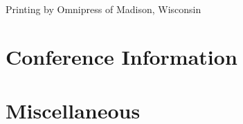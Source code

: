 \documentclass[twoside,makeidx]{book}
\begin{document}
\fancyfoot[C]{}


\fancyfoot[C]{\thepage}



\clearpage
\thispagestyle{empty}
\mbox{}
\vfill
\noindent Printing by Omnipress of Madison, Wisconsin \\
\newpage

\frontmatter


\setcounter{tocdepth}{2}
\tableofcontents
\mainmatter
\pagestyle{fancy}


\chapter{Conference Information}


\clearpage


\clearpage%
\setheaders{}{}


\clearpage
%
\clearpage%
\setheaders{}{}

%

\clearpage














\chapter{Miscellaneous}
\end{document}
